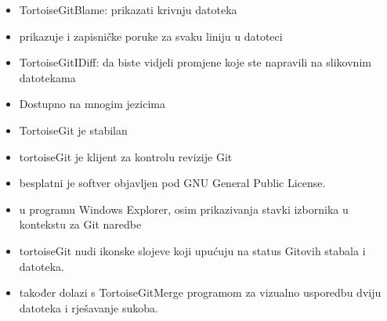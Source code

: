 \begin{frame}[allowframebreaks]
\begin{itemize}
 \item TortoiseGitBlame: prikazati krivnju datoteka
 \item prikazuje i zapisničke poruke za svaku liniju u datoteci
 \item TortoiseGitIDiff: da biste vidjeli promjene koje ste napravili na slikovnim datotekama 
 \framebreak
 \item Dostupno na mnogim jezicima
 \item TortoiseGit je stabilan
 \item tortoiseGit je klijent za kontrolu revizije Git
 \item besplatni je softver objavljen pod GNU General Public License.
 \item u programu Windows Explorer, osim prikazivanja stavki izbornika u kontekstu za Git naredbe
 \item tortoiseGit nudi ikonske slojeve koji upućuju na status Gitovih stabala i datoteka.
 \item također dolazi s TortoiseGitMerge programom za vizualno usporedbu dviju datoteka i rješavanje sukoba.
\end{itemize}
\end{frame}